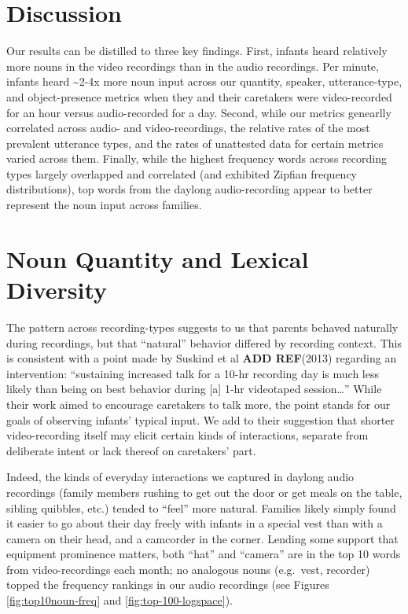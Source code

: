 \documentclass[floatsintext,man]{apa6}
\theoremstyle{definition}
\theoremstyle{definition}
\theoremstyle{definition}
\theoremstyle{remark}
\begin{document}
\section{Discussion}\label{discussion}

Our results can be distilled to three key findings. First, infants heard
relatively more nouns in the video recordings than in the audio
recordings. Per minute, infants heard \textasciitilde{}2-4x more noun
input across our quantity, speaker, utterance-type, and object-presence
metrics when they and their caretakers were video-recorded for an hour
versus audio-recorded for a day. Second, while our metrics genearlly
correlated across audio- and video-recordings, the relative rates of the
most prevalent utterance types, and the rates of unattested data for
certain metrics varied across them. Finally, while the highest frequency
words across recording types largely overlapped and correlated (and
exhibited Zipfian frequency distributions), top words from the daylong
audio-recording appear to better represent the noun input across
families.

\section{Noun Quantity and Lexical
Diversity}\label{noun-quantity-and-lexical-diversity}

The pattern across recording-types suggests to us that parents behaved
naturally during recordings, but that \enquote{natural} behavior
differed by recording context. This is consistent with a point made by
Suskind et al \textbf{ADD REF}(2013) regarding an intervention:
\enquote{sustaining increased talk for a 10-hr recording day is much
less likely than being on best behavior during {[}a{]} 1-hr videotaped
session\ldots{}} While their work aimed to encourage caretakers to talk
more, the point stands for our goals of observing infants' typical
input. We add to their suggestion that shorter video-recording itself
may elicit certain kinds of interactions, separate from deliberate
intent or lack thereof on caretakers' part.

Indeed, the kinds of everyday interactions we captured in daylong audio
recordings (family members rushing to get out the door or get meals on
the table, sibling quibbles, etc.) tended to \enquote{feel} more
natural. Families likely simply found it easier to go about their day
freely with infants in a special vest than with a camera on their head,
and a camcorder in the corner. Lending some support that equipment
prominence matters, both \enquote{hat} and \enquote{camera} are in the
top 10 words from video-recordings each month; no analogous nouns
(e.g.~vest, recorder) topped the frequency rankings in our audio
recordings (see Figures \ref{fig:top10noun-freq} and
\ref{fig:top-100-logspace}).
\end{document}
